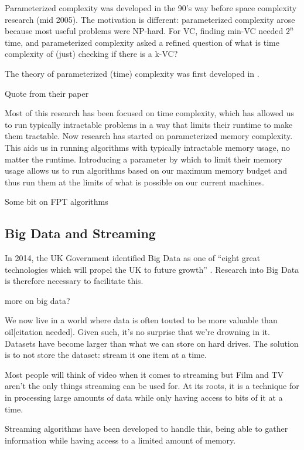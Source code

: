 Parameterized complexity was developed in the 90's way before space complexity
research (mid 2005). The motivation is different: parameterized complexity
arose because most useful problems were NP-hard. For VC, finding min-VC needed
$2^n$ time, and parameterized complexity asked a refined question of what is time
complexity of (just) checking if there is a k-VC?

The theory of parameterized (time) complexity was first developed in
\cite{downey1999parameterized}.

Quote from their paper

Most of this research has been focused on time complexity, which has allowed us
to run typically intractable problems in a way that limits their runtime to
make them tractable. Now research has started on parameterized memory
complexity. This aids us in running algorithms with typically intractable
memory usage, no matter the runtime. Introducing a parameter by which to limit their
memory usage allows us to run algorithms based on our maximum memory budget
and thus run them at the limits of what is possible on our current machines.

Some bit on FPT algorithms

\subsection{Big Data and Streaming}

In 2014, the UK Government identified Big Data as one of ``eight great
technologies which will propel the UK to future growth''
\cite{intellectualpropertyoffice2014}. Research into Big Data is therefore
necessary to facilitate this.

more on big data?

We now live in a world where data is often touted to be more valuable than
oil[citation needed]. Given such, it's no surprise that we're drowning in it.
Datasets have become larger than what we can store on hard drives. The solution
is to not store the dataset: stream it one item at a time.

Most people will think of video when it comes to streaming but Film and TV
aren't the only things streaming can be used for. At its roots, it is a
technique for in processing large amounts of data while only having access to
bits of it at a time.

Streaming algorithms have been developed to handle this, being able to gather
information while having access to a limited amount of memory.

